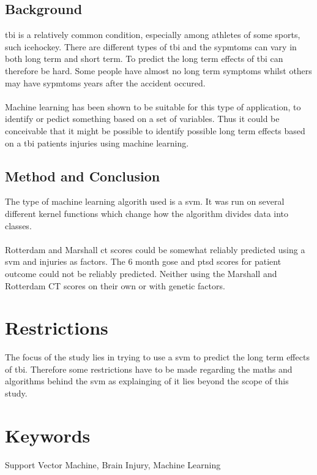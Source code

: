 \documentclass[11pt]{article}
\begin{document}
\subsection*{Background}

\gls{tbi} is a relatively common condition, especially among athletes of some sports, such icehockey\cite{TraumaticBrainInjury}. There are different types of \gls{tbi} and the sypmtoms can vary in both long term and short term. To predict the long term effects of \gls{tbi} can therefore be hard. Some people have almost no long term symptoms whilst others may have sypmtoms years after the accident occured.\cite{TraumaticBrainInjury2021}\\
\\
Machine learning has been shown to be suitable for this type of application, to identify or pedict something based on a set of variables\cite{MachineLearning2021}. Thus it could be conceivable that it might be possible to identify possible long term effects based on a \gls{tbi} patients injuries using machine learning.

\subsection*{Method and Conclusion}
The type of machine learning algorith used is a \gls{svm}. It was run on several different kernel functions which change how the algorithm divides data into classes\cite{KernelMethod2021}.\cite{jamesSupportVectorMachines}\\
\\
Rotterdam and Marshall \gls{ct} scores could be somewhat reliably predicted using a \gls{svm} and injuries as factors. The 6 month \gls{gose} and \gls{ptsd} scores for patient outcome could not be reliably predicted. Neither using the Marshall and Rotterdam CT scores on their own or with genetic factors.
\section*{Restrictions}
The focus of the study lies in trying to use a \gls{svm} to predict the long term effects of \gls{tbi}. Therefore some restrictions have to be made regarding the maths and algorithms behind the \gls{svm} as explainging of it lies beyond the scope of this study.

\section*{Keywords}
Support Vector Machine, Brain Injury, Machine Learning
\end{document}
